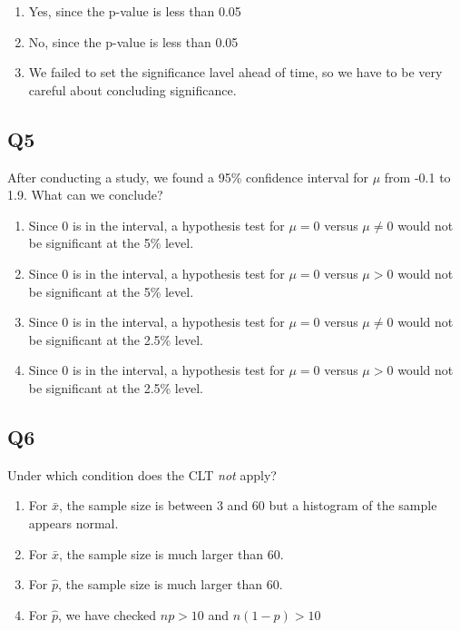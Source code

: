 \documentclass[
  letterpaper,
  DIV=11,
  numbers=noendperiod]{scrreprt}
\providecommand{\tightlist}{%
  \setlength{\itemsep}{0pt}\setlength{\parskip}{0pt}}\usepackage{longtable,booktabs,array}
\def\pspace{}
\begin{document}
\pspace

\begin{enumerate}
\def\labelenumi{\arabic{enumi}.}
\tightlist
\item
  Yes, since the p-value is less than 0.05
\item
  No, since the p-value is less than 0.05
\item
  We failed to set the significance lavel ahead of time, so we have to
  be very careful about concluding significance.
\end{enumerate}

\hypertarget{q5-2}{%
\subsection{Q5}\label{q5-2}}

After conducting a study, we found a 95\% confidence interval for
\(\mu\) from -0.1 to 1.9. What can we conclude?

\pspace

\begin{enumerate}
\def\labelenumi{\arabic{enumi}.}
\tightlist
\item
  Since 0 is in the interval, a hypothesis test for \(\mu = 0\) versus
  \(\mu \ne 0\) would not be significant at the 5\% level.
\item
  Since 0 is in the interval, a hypothesis test for \(\mu = 0\) versus
  \(\mu > 0\) would not be significant at the 5\% level.
\item
  Since 0 is in the interval, a hypothesis test for \(\mu = 0\) versus
  \(\mu \ne 0\) would not be significant at the 2.5\% level.
\item
  Since 0 is in the interval, a hypothesis test for \(\mu = 0\) versus
  \(\mu > 0\) would not be significant at the 2.5\% level.
\end{enumerate}

\hypertarget{q6-1}{%
\subsection{Q6}\label{q6-1}}

Under which condition does the CLT \emph{not} apply?

\pspace

\begin{enumerate}
\def\labelenumi{\arabic{enumi}.}
\tightlist
\item
  For \(\bar x\), the sample size is between 3 and 60 but a histogram of
  the sample appears normal.
\item
  For \(\bar x\), the sample size is much larger than 60.
\item
  For \(\hat p\), the sample size is much larger than 60.
\item
  For \(\hat p\), we have checked \(np>10\) and \(n(1-p)>10\)
\end{enumerate}
\end{document}
